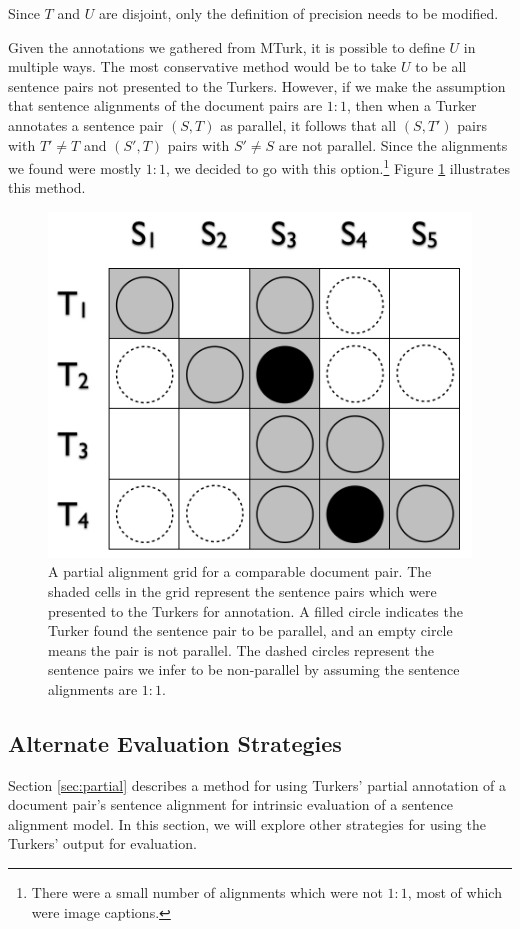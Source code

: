 Since $T$ and $U$ are disjoint, only the definition of precision needs to
be modified. 

Given the annotations we gathered from MTurk, it is possible to define $U$ in
multiple ways. The most conservative method would be to take $U$ to be all
sentence pairs not presented to the Turkers. However, if we make the assumption
that sentence alignments of the document pairs are $1:1$, then when a Turker
annotates a sentence pair $(S, T)$ as parallel, it follows that all $(S, T')$
pairs with $T' \neq T$ and $(S', T)$ pairs with $S' \neq S$ are not parallel.
Since the alignments we found were mostly $1:1$, we decided to go with this
option.\footnote{There were a small number of alignments which were not $1:1$,
most of which were image captions.} Figure \ref{fig:partial_align} illustrates
this method.

\begin{figure}
\begin{center}
\includegraphics[scale=0.5]{images/partial_alignment.png}
\caption{A partial alignment grid for a comparable document pair. The shaded
cells in the grid represent the sentence pairs which were presented to the
Turkers for annotation. A filled circle indicates the Turker found the sentence
pair to be parallel, and an empty circle means the pair is not parallel. The
dashed circles represent the sentence pairs we infer to be non-parallel by
assuming the sentence alignments are $1:1$.}
\label{fig:partial_align}
\end{center}
\end{figure}

\subsection{Alternate Evaluation Strategies}
Section \ref{sec:partial} describes a method for using Turkers' partial
annotation of a document pair's sentence alignment for intrinsic evaluation of a
sentence alignment model. In this section, we will explore other
strategies for using the Turkers' output for evaluation.

